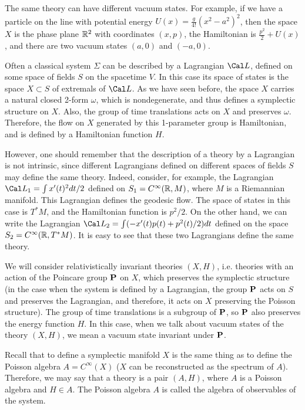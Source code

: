 The same theory can have different vacuum states. For example, 
if we have a particle on the line with potential energy
$U(x)=\frac{g}{4!}(x^2-a^2)^2$, 
then the space $X$ is the phase plane $\Bbb R^2$ with 
coordinates $(x,p)$, the Hamiltonian is $\frac{p^2}{2}+U(x)$, 
and there are two vacuum states $(a,0)$ and $(-a,0)$. 

Often a classical system $\Sigma$ can be described 
by a Lagrangian $\Cal L$, defined on some
space of fields $S$ on the spacetime $V$. 
In this case its space of states is 
the space $X\subset S$ of extremals of $\Cal L$. 
As we have seen before, the space $X$ carries a 
natural closed 2-form $\omega$, which is nondegenerate, and 
thus defines a symplectic structure on $X$. Also, the group of time 
translations acts on $X$ and preserves $\omega$. Therefore, 
the flow on $X$ generated by this 1-parameter group 
is Hamiltonian, and is defined by a Hamiltonian function $H$. 

However, one should remember that 
the description of a theory by a Lagrangian is not intrinsic, 
since different Lagrangians defined on different spaces of fields $S$
may define the same theory. Indeed, consider, for example, 
the Lagrangian $\Cal L_1=\int x'(t)^2dt/2$ defined on 
$S_1=C^\infty(\Bbb R,M)$, where $M$ is a Riemannian manifold. 
This Lagrangian defines the geodesic flow. The space of states
in this case is $T^*M$, and the Hamiltonian function is $p^2/2$. 
On the other hand, we can write the Lagrangian 
$\Cal L_2=\int (-x'(t)p(t)+p^2(t)/2)dt$ defined on 
the space $S_2=C^\infty(\Bbb R,T^*M)$. It is easy to see 
that these two Lagrangians define the same theory. 

We will consider relativistically invariant theories $(X,H)$, i.e.
theories with an action of the Poincare group $\bold P$ on 
$X$, which preserves the symplectic structure
(in the case when the system is defined by a Lagrangian, 
the group $\bold P$ acts on $S$ and preserves the Lagrangian, and therefore, 
it acts on $X$ preserving the Poisson structure). The group of time 
translations is a subgroup of $\bold P$, so $\bold P$ also preserves 
the energy function $H$. 
In this case, when we talk about vacuum states of the theory $(X,H)$, 
we mean a vacuum state invariant under $\bold P$.  

Recall that to define a symplectic manifold $X$ is the same thing as to 
define the Poisson algebra $A=C^\infty(X)$
($X$ can be reconstructed as the spectrum of $A$). Therefore, we may say that
a theory is a pair $(A,H)$, where $A$ is a Poisson algebra and $H\in A$. 
The Poisson algebra $A$ is called the algebra of observables of the system. 


